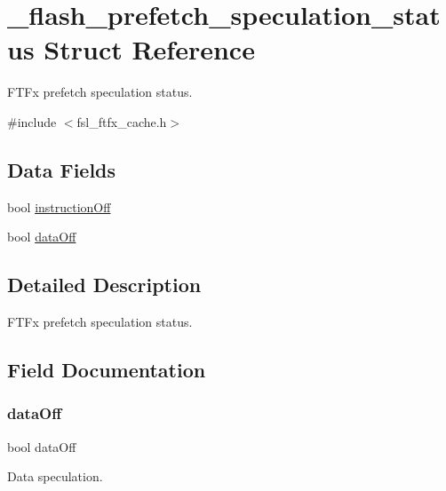 \hypertarget{struct__flash__prefetch__speculation__status}{}\section{\+\_\+flash\+\_\+prefetch\+\_\+speculation\+\_\+status Struct Reference}
\label{struct__flash__prefetch__speculation__status}


F\+T\+Fx prefetch speculation status.  




{\ttfamily \#include $<$fsl\+\_\+ftfx\+\_\+cache.\+h$>$}

\subsection*{Data Fields}
\begin{DoxyCompactItemize}
\item 
bool \mbox{\hyperlink{struct__flash__prefetch__speculation__status_a53c2d6f6c4dfdbc4d8559d80cdcde069}{instruction\+Off}}
\item 
bool \mbox{\hyperlink{struct__flash__prefetch__speculation__status_a64b49c706d191a8698665d1b389f7e9d}{data\+Off}}
\end{DoxyCompactItemize}


\subsection{Detailed Description}
F\+T\+Fx prefetch speculation status. 

\subsection{Field Documentation}
\mbox{\label{struct__flash__prefetch__speculation__status_a64b49c706d191a8698665d1b389f7e9d}} 
\subsubsection{\texorpdfstring{dataOff}{dataOff}}
{\footnotesize\ttfamily bool data\+Off}

Data speculation. \mbox{\label{struct__flash__prefetch__speculation__status_a53c2d6f6c4dfdbc4d8559d80cdcde069}} 
